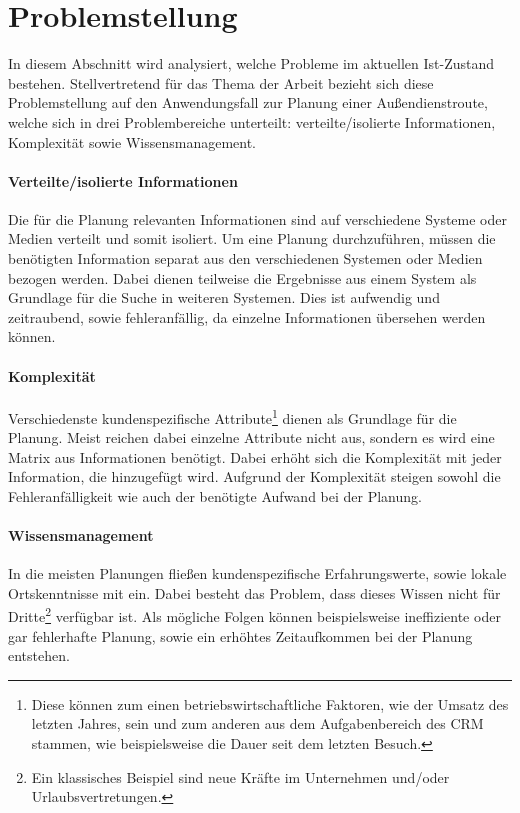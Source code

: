 \documentclass[Bachelorarbeit.tex]{subfiles}
\begin{document}
\section{Problemstellung}
\label{chap:einfuehrung:sec:problemstellung}
In diesem Abschnitt wird analysiert, welche Probleme im aktuellen Ist-Zustand bestehen.
Stellvertretend für das Thema der Arbeit bezieht sich diese Problemstellung auf den Anwendungsfall zur Planung einer Außendienstroute, welche sich in drei Problembereiche unterteilt: verteilte/isolierte Informationen, Komplexität sowie Wissensmanagement.

\paragraph*{Verteilte/isolierte Informationen}
Die für die Planung relevanten Informationen sind auf verschiedene Systeme oder Medien verteilt und somit isoliert. 
Um eine Planung durchzuführen, müssen die benötigten Information separat aus den verschiedenen Systemen oder Medien bezogen werden.
Dabei dienen teilweise die Ergebnisse aus einem System als Grundlage für die Suche in weiteren Systemen.
Dies ist aufwendig und zeitraubend, sowie fehleranfällig, da einzelne Informationen übersehen werden können.

\paragraph*{Komplexität}
Verschiedenste kundenspezifische Attribute\footnote{
	Diese können zum einen betriebswirtschaftliche Faktoren, wie der Umsatz des letzten Jahres, sein  und zum anderen aus dem Aufgabenbereich des \ac{CRM} stammen, wie beispielsweise die Dauer seit dem letzten Besuch.
	} dienen als Grundlage für die Planung.
Meist reichen dabei einzelne Attribute nicht aus, sondern es wird eine Matrix aus Informationen benötigt.
Dabei erhöht sich die Komplexität mit jeder Information, die hinzugefügt wird.
Aufgrund der Komplexität steigen sowohl die Fehleranfälligkeit wie auch der benötigte Aufwand bei der Planung.

\paragraph*{Wissensmanagement}
In die meisten Planungen fließen kundenspezifische Erfahrungswerte, sowie lokale Ortskenntnisse mit ein.
Dabei besteht das Problem, dass dieses Wissen nicht für Dritte\footnote{Ein klassisches Beispiel sind neue Kräfte im Unternehmen und/oder Urlaubsvertretungen.} verfügbar ist.
Als mögliche Folgen können beispielsweise ineffiziente oder gar fehlerhafte Planung, sowie ein erhöhtes Zeitaufkommen bei der Planung entstehen. 
\end{document}
